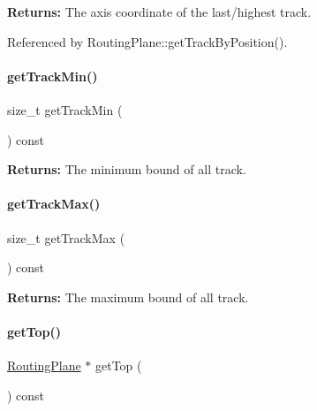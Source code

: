 {\bfseries Returns\+:} The axis coordinate of the last/highest track. 

Referenced by Routing\+Plane\+::get\+Track\+By\+Position().

\mbox{\label{classKite_1_1RoutingPlane_afd185bba655c6f59e11b5652352cb902}} 
\paragraph{\texorpdfstring{get\+Track\+Min()}{getTrackMin()}}
{\footnotesize\ttfamily size\+\_\+t get\+Track\+Min (\begin{DoxyParamCaption}{ }\end{DoxyParamCaption}) const\hspace{0.3cm}{\ttfamily [inline]}}

{\bfseries Returns\+:} The minimum bound of all track. \mbox{\label{classKite_1_1RoutingPlane_a5a0f37c5727c0d5bf286ed79b7143989}} 
\paragraph{\texorpdfstring{get\+Track\+Max()}{getTrackMax()}}
{\footnotesize\ttfamily size\+\_\+t get\+Track\+Max (\begin{DoxyParamCaption}{ }\end{DoxyParamCaption}) const\hspace{0.3cm}{\ttfamily [inline]}}

{\bfseries Returns\+:} The maximum bound of all track. \mbox{\label{classKite_1_1RoutingPlane_a855e69cd11c46df8c37843f25cabee05}} 
\paragraph{\texorpdfstring{get\+Top()}{getTop()}}
{\footnotesize\ttfamily \hyperlink{classKite_1_1RoutingPlane}{Routing\+Plane} $\ast$ get\+Top (\begin{DoxyParamCaption}{ }\end{DoxyParamCaption}) const}

